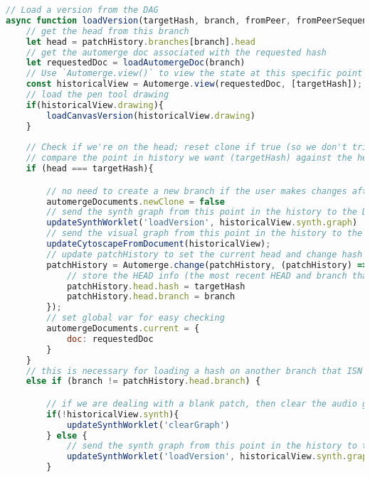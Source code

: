 \begin{lstlisting}[language=JavaScript, caption={The loadVersion() function loads a specific changeNode from the patch history when a player selects it in the DAG, restoring the associated synth configuration and patch history sequencer state using the provided branch name and hash.}, label={lst:loadVersion-function}]
// Load a version from the DAG
async function loadVersion(targetHash, branch, fromPeer, fromPeerSequencer) {
    // get the head from this branch
    let head = patchHistory.branches[branch].head
    // get the automerge doc associated with the requested hash
    let requestedDoc = loadAutomergeDoc(branch)
    // Use `Automerge.view()` to view the state at this specific point in history
    const historicalView = Automerge.view(requestedDoc, [targetHash]);
    // load the pen tool drawing
    if(historicalView.drawing){
        loadCanvasVersion(historicalView.drawing)
    }
    
    // Check if we're on the head; reset clone if true (so we don't trigger opening a new branch with changes made to head)
    // compare the point in history we want (targetHash) against the head of its associated branch (head)
    if (head === targetHash){

        // no need to create a new branch if the user makes changes after this operation
        automergeDocuments.newClone = false
        // send the synth graph from this point in the history to the DSP worklet first
        updateSynthWorklet('loadVersion', historicalView.synth.graph)
        // send the visual graph from this point in the history to the synth cytoscape
        updateCytoscapeFromDocument(historicalView);
        // update patchHistory to set the current head and change hash
        patchHistory = Automerge.change(patchHistory, (patchHistory) => {
            // store the HEAD info (the most recent HEAD and branch that were viewed or operated on)
            patchHistory.head.hash = targetHash
            patchHistory.head.branch = branch
        });
        // set global var for easy checking
        automergeDocuments.current = {
            doc: requestedDoc
        }        
    } 
    // this is necessary for loading a hash on another branch that ISN'T the head
    else if (branch != patchHistory.head.branch) {

        // if we are dealing with a blank patch, then clear the audio graph
        if(!historicalView.synth){
            updateSynthWorklet('clearGraph')
        } else {
            // send the synth graph from this point in the history to the DSP worklet first
            updateSynthWorklet('loadVersion', historicalView.synth.graph, null, historicalView.changeType)
        }


\end{lstlisting}
